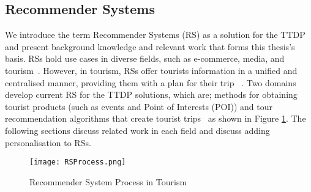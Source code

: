 \subsection{Recommender Systems} 

We introduce the term Recommender Systems (RS) as a solution for the TTDP and
present background knowledge and relevant work that forms this thesis's basis.
RSs hold use cases in diverse fields, such as e-commerce, media, and
tourism~\cite{Herzog2020}. However, in tourism, RSs offer tourists information
in a unified and centralised manner, providing them with a plan for their trip
~\cite{Santamaria-Granados2020, DiBitonto2010a, Lim2018}.  Two domains develop
current RS for the TTDP solutions, which are; methods for obtaining tourist
products (such as events and Point of Interests (POI)) and tour recommendation
algorithms that create tourist trips~\cite{Lim2018} as shown in Figure \ref{RS}.  The following sections
discuss related work in each field and discuss adding personalisation to RSs.

\begin{figure}[h]
\centering
\texttt{[image: RSProcess.png]}
\caption{Recommender System Process in Tourism}
\label{RS}
\end{figure}





